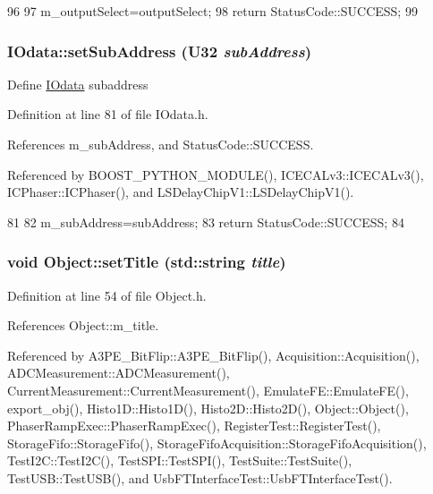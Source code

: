\begin{DoxyCode}
96                                               {
97     m_outputSelect=outputSelect;
98     return StatusCode::SUCCESS;
99   }
\end{DoxyCode}
\hypertarget{classIOdata_aeca09aa9a8c2ccc4c3a728b2ddcf4b2a}{
\subsubsection[{setSubAddress}]{ IOdata::setSubAddress ({\bf U32} {\em subAddress})}}
\label{classIOdata_aeca09aa9a8c2ccc4c3a728b2ddcf4b2a}
Define \hyperlink{classIOdata}{IOdata} subaddress 

Definition at line 81 of file IOdata.h.

References m\_\-subAddress, and StatusCode::SUCCESS.

Referenced by BOOST\_\-PYTHON\_\-MODULE(), ICECALv3::ICECALv3(), ICPhaser::ICPhaser(), and LSDelayChipV1::LSDelayChipV1().


\begin{DoxyCode}
81                                           {
82     m_subAddress=subAddress;
83     return StatusCode::SUCCESS;
84   }
\end{DoxyCode}
\hypertarget{classObject_a89557dbbad5bcaa02652f5d7fa35d20f}{
\subsubsection[{setTitle}]{\setlength{\rightskip}{0pt plus 5cm}void Object::setTitle (std::string {\em title})}}
\label{classObject_a89557dbbad5bcaa02652f5d7fa35d20f}


Definition at line 54 of file Object.h.

References Object::m\_\-title.

Referenced by A3PE\_\-BitFlip::A3PE\_\-BitFlip(), Acquisition::Acquisition(), ADCMeasurement::ADCMeasurement(), CurrentMeasurement::CurrentMeasurement(), EmulateFE::EmulateFE(), export\_\-obj(), Histo1D::Histo1D(), Histo2D::Histo2D(), Object::Object(), PhaserRampExec::PhaserRampExec(), RegisterTest::RegisterTest(), StorageFifo::StorageFifo(), StorageFifoAcquisition::StorageFifoAcquisition(), TestI2C::TestI2C(), TestSPI::TestSPI(), TestSuite::TestSuite(), TestUSB::TestUSB(), and UsbFTInterfaceTest::UsbFTInterfaceTest().


